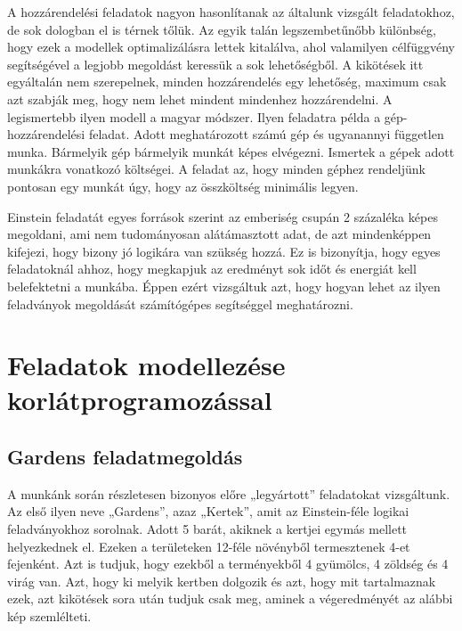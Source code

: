 \documentclass[12pt,a4paper,twoside, openright]{report}
\begin{document}
    A hozzárendelési feladatok nagyon hasonlítanak az általunk vizsgált feladatokhoz, de sok dologban el is térnek tőlük.
    Az egyik talán legszembetűnőbb különbség, hogy ezek a modellek optimalizálásra lettek kitalálva, ahol valamilyen célfüggvény segítségével a legjobb megoldást keressük a sok lehetőségből.
    A kikötések itt egyáltalán nem szerepelnek, minden hozzárendelés egy lehetőség, maximum csak azt szabják meg, hogy nem lehet mindent mindenhez hozzárendelni.
    A legismertebb ilyen modell a magyar módszer\cite{magyarmodszer}.
    Ilyen feladatra példa a gép-hozzárendelési feladat.
    Adott meghatározott számú gép és ugyanannyi független munka.
    Bármelyik gép bármelyik munkát képes elvégezni.
    Ismertek a gépek adott munkákra vonatkozó költségei.
    A feladat az, hogy minden géphez rendeljünk pontosan egy munkát úgy, hogy az összköltség minimális legyen.

    Einstein feladatát egyes források szerint az emberiség csupán 2 százaléka képes megoldani, ami nem tudományosan alátámasztott adat, de azt mindenképpen kifejezi, hogy bizony jó logikára van szükség hozzá.
    Ez is bizonyítja, hogy egyes feladatoknál ahhoz, hogy megkapjuk az eredményt sok időt és energiát kell belefektetni a munkába.
    Éppen ezért vizsgáltuk azt, hogy hogyan lehet az ilyen feladványok megoldását számítógépes segítséggel meghatározni.
		
\chapter{Feladatok modellezése korlátprogramozással}

\section{Gardens feladatmegoldás} 

    A munkánk során részletesen bizonyos előre „legyártott” feladatokat vizsgáltunk.
    Az első ilyen neve „Gardens”, azaz „Kertek”, amit az Einstein-féle logikai feladványokhoz sorolnak\cite{gardens}.
    Adott 5 barát, akiknek a kertjei egymás mellett helyezkednek el.
    Ezeken a területeken 12-féle növényből termesztenek 4-et fejenként.
    Azt is tudjuk, hogy ezekből a terményekből 4 gyümölcs, 4 zöldség és 4 virág van.
    Azt, hogy ki melyik kertben dolgozik és azt, hogy mit tartalmaznak ezek, azt kikötések sora után tudjuk csak meg, aminek a végeredményét az alábbi kép szemlélteti.


\end{document}
